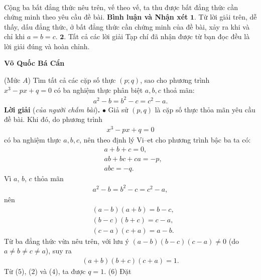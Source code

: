 \begin{multicols}{2}
\begin{align*}
	\end{align*}
	Cộng ba bất đẳng thức nêu trên, vế theo vế, ta thu được bất đẳng thức cần chứng minh theo yêu cầu đề bài.
	\vskip 0.05cm
	\textbf{\color{thachthuctoanhoc}Bình luận và Nhận xét}
	\vskip 0.05cm
	$\pmb{1.}$ Từ lời giải trên, dễ thấy, dấu đẳng thức, ở bất đẳng thức cần chứng minh của đề bài, xảy ra khi và chỉ khi $a = b = c$.
	\vskip 0.05cm
	$\pmb{2.}$ Tất cả các lời giải Tạp chí đã nhận được từ bạn đọc đều là lời giải đúng và hoàn chỉnh.
	\begin{flushright}
		\textbf{\color{thachthuctoanhoc}Võ Quốc Bá Cẩn}
	\end{flushright}
	{}
	(Mức $A$) Tìm tất cả các cặp số thực $(p;q)$, sao cho phương trình $x^3-px+q=0$ có ba nghiệm thực phân biệt $a,b,c$  thoả mãn:
	\begin{align*}
		a^2-b=b^2-c=c^2-a.
	\end{align*}
	\textbf{\color{thachthuctoanhoc}Lời giải} (\textit{của người chấm bài})\textbf{\color{thachthuctoanhoc}.}
	\vskip 0.05cm
	$\bullet$ Giả sử $(p, q)$ là cặp số thực thỏa mãn yêu cầu đề bài.
	\vskip 0.05cm
	Khi đó, do phương trình
	\begin{align*}
		{x^3} - px + q = 0 \tag{$1$}
	\end{align*}
	có ba nghiệm thực $a, b, c$, nên theo định lý Vi--et cho phương trình bậc ba ta có:
	\begin{align*}
		&a + b + c = 0, \tag{$2$}\\
		&ab + bc + ca = -p,  \tag{$3$}\\
		&abc = -q. \tag{$4$}  
	\end{align*}
	Vì $a$, $b$, $c$ thỏa mãn
	\begin{align*}
		{a^2} - b = {b^2} - c = {c^2} - a,
	\end{align*}
	nên
	\begin{align*}
		&\left( {a - b} \right)\left( {a + b} \right) = b - c,\\
		&\left( {b - c} \right)\left( {b + c} \right) = c - a,\\
		&\left( {c - a} \right)\left( {c + a} \right) = a - b.
	\end{align*}
	Từ ba đẳng thức vừa nêu trên, với lưu ý $(a - b)(b - c)(c - a) \ne 0$ (do $a \ne b \ne c \ne a$), suy ra
    \begin{align*}
    		(a + b)(b + c)(c + a) = 1.
    \end{align*}
	Từ ($5$), ($2$) và ($4$), ta được $q = 1$. \hfill ($6$)
	Đặt
	\begin{align*}

\end{align*}
\end{multicols}
